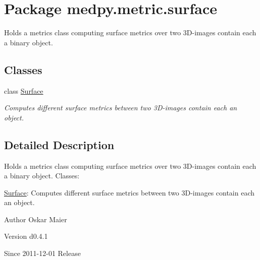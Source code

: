 \hypertarget{namespacemedpy_1_1metric_1_1surface}{
\section{Package medpy.metric.surface}
\label{namespacemedpy_1_1metric_1_1surface}
}


Holds a metrics class computing surface metrics over two 3D-\/images contain each a binary object.  


\subsection*{Classes}
\begin{DoxyCompactItemize}
\item 
class \hyperlink{classmedpy_1_1metric_1_1surface_1_1Surface}{Surface}
\begin{DoxyCompactList}\small\item\em Computes different surface metrics between two 3D-\/images contain each an object. \end{DoxyCompactList}\end{DoxyCompactItemize}


\subsection{Detailed Description}
Holds a metrics class computing surface metrics over two 3D-\/images contain each a binary object. Classes:
\begin{DoxyItemize}
\item \hyperlink{classmedpy_1_1metric_1_1surface_1_1Surface}{Surface}: Computes different surface metrics between two 3D-\/images contain each an object.
\end{DoxyItemize}

\begin{DoxyAuthor}{Author}
Oskar Maier 
\end{DoxyAuthor}
\begin{DoxyVersion}{Version}
d0.4.1 
\end{DoxyVersion}
\begin{DoxySince}{Since}
2011-\/12-\/01  Release 
\end{DoxySince}
